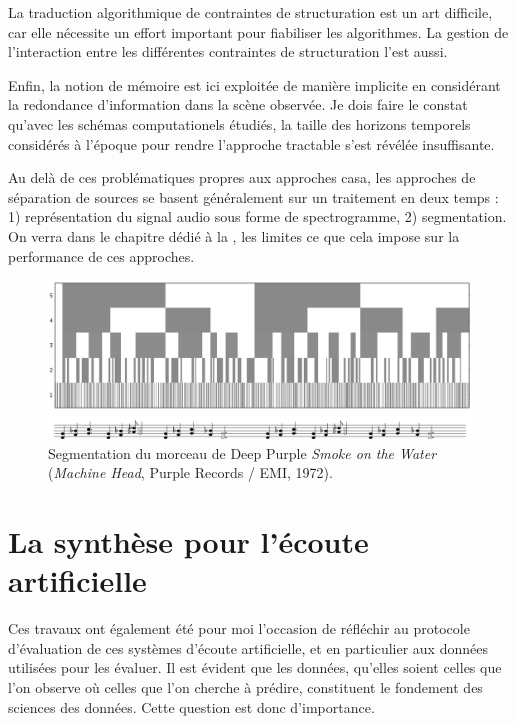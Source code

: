   La traduction algorithmique de contraintes de structuration est un art difficile, car elle nécessite un effort important pour fiabiliser les algorithmes. La gestion de l'interaction entre les différentes contraintes de structuration l'est aussi.

  Enfin, la notion de mémoire est ici exploitée de manière implicite en considérant la redondance d'information dans la scène observée. Je dois faire le constat qu'avec les schémas computationels étudiés, la taille des horizons temporels considérés à l'époque pour rendre l'approche tractable s'est révélée insuffisante.



  Au delà de ces problématiques propres aux approches casa, les approches de séparation de sources se basent généralement sur un traitement en deux temps : 1) représentation du signal audio sous forme de spectrogramme, 2) segmentation. On verra dans le chapitre dédié à la , les limites ce que cela impose sur la performance de ces approches.

  \begin{figure}[t]
    \includegraphics[width=\textwidth]{figures/smokeCrop}
    \caption{Segmentation du morceau de Deep Purple \emph{Smoke on the Water} (\emph{Machine Head}, Purple Records / EMI, 1972).}  \label{fig:smoke}
  \end{figure}

  \section{ \nmu La  synthèse pour l'écoute artificielle} \label{sec:dcase}

  Ces travaux ont également été pour moi l'occasion de réfléchir au protocole d'évaluation de ces systèmes d'écoute artificielle, et en particulier aux données utilisées pour les évaluer. Il est évident que les données, qu'elles soient celles que l'on observe où celles que l'on cherche à prédire, constituent le fondement des sciences des données. Cette question est donc d'importance.

